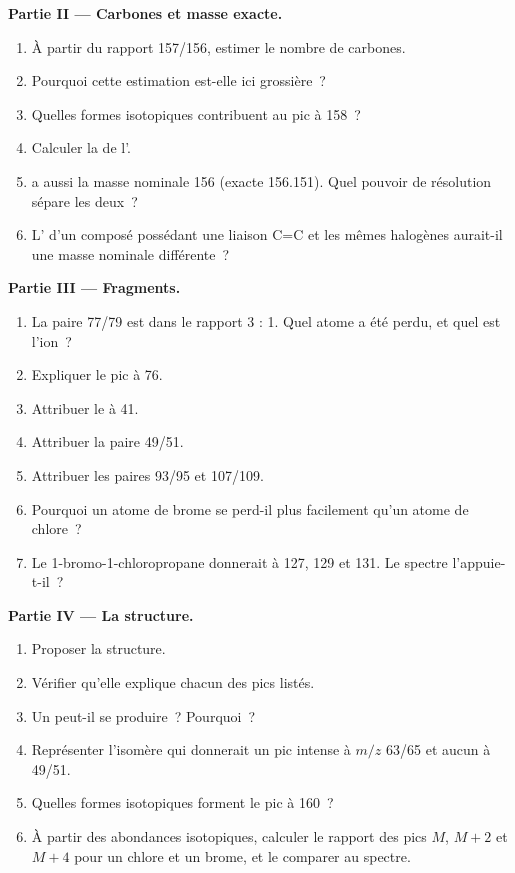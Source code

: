 \begin{problem}
\medskip
\noindent\textbf{Partie II --- Carbones et masse exacte.}
\begin{enumerate}[resume]
  \item À partir du rapport 157/156, estimer le nombre de carbones.
  \item Pourquoi cette estimation est-elle ici grossière~?
  \item Quelles formes isotopiques contribuent au pic à 158~?
  \item Calculer la  de l'.
  \item {} a aussi la masse nominale 156 (exacte 156.151). Quel pouvoir de résolution sépare les
        deux~?
  \item L' d'un composé possédant une liaison C=C et les mêmes halogènes aurait-il une
        masse nominale différente~?
\end{enumerate}

\medskip
\noindent\textbf{Partie III --- Fragments.}
\begin{enumerate}[resume]
  \item La paire 77/79 est dans le rapport 3 : 1. Quel atome a été perdu, et quel est l'ion~?
  \item Expliquer le pic à 76.
  \item Attribuer le  à 41.
  \item Attribuer la paire 49/51.
  \item Attribuer les paires 93/95 et 107/109.
  \item Pourquoi un atome de brome se perd-il plus facilement qu'un atome de chlore~?
  \item Le 1-bromo-1-chloropropane donnerait  à 127, 129 et 131. Le spectre l'appuie-t-il~?
\end{enumerate}

\medskip
\noindent\textbf{Partie IV --- La structure.}
\begin{enumerate}[resume]
  \item Proposer la structure.
  \item Vérifier qu'elle explique chacun des pics listés.
  \item Un  peut-il se produire~? Pourquoi~?
  \item Représenter l'isomère qui donnerait un pic intense à $m/z$ 63/65 et aucun à 49/51.
  \item Quelles formes isotopiques forment le pic à 160~?
  \item À partir des abondances isotopiques, calculer le rapport des pics $M$, $M+2$ et $M+4$ pour un
        chlore et un brome, et le comparer au spectre.
\end{enumerate}
\end{problem}

